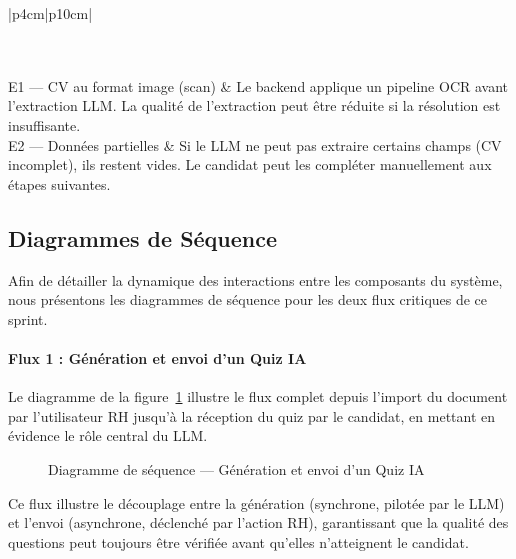 \begin{longtable}{|p{4cm}|p{10cm}|}
{\begin{enumerate}
\end{enumerate}
\vspace{2pt}
} \\ \hline
{} \\ \hline
E1 — CV au format image (scan) & Le backend applique un pipeline OCR avant l'extraction LLM. La qualité de l'extraction peut être réduite si la résolution est insuffisante. \\ \hline
E2 — Données partielles & Si le LLM ne peut pas extraire certains champs (CV incomplet), ils restent vides. Le candidat peut les compléter manuellement aux étapes suivantes. \\ \hline
\end{longtable}
\renewcommand{\arraystretch}{1}

\subsection{Diagrammes de Séquence}

Afin de détailler la dynamique des interactions entre les composants du système, nous présentons les diagrammes de séquence pour les deux flux critiques de ce sprint.

\paragraph{Flux 1 : Génération et envoi d'un Quiz IA}
Le diagramme de la figure~\ref{fig:seq_quiz_generation} illustre le flux complet depuis l'import du document par l'utilisateur RH jusqu'à la réception du quiz par le candidat, en mettant en évidence le rôle central du LLM.

\begin{figure}[H]
    \centering
    \caption{Diagramme de séquence — Génération et envoi d'un Quiz IA}
    \label{fig:seq_quiz_generation}
\end{figure}

Ce flux illustre le découplage entre la génération (synchrone, pilotée par le LLM) et l'envoi (asynchrone, déclenché par l'action RH), garantissant que la qualité des questions peut toujours être vérifiée avant qu'elles n'atteignent le candidat.

